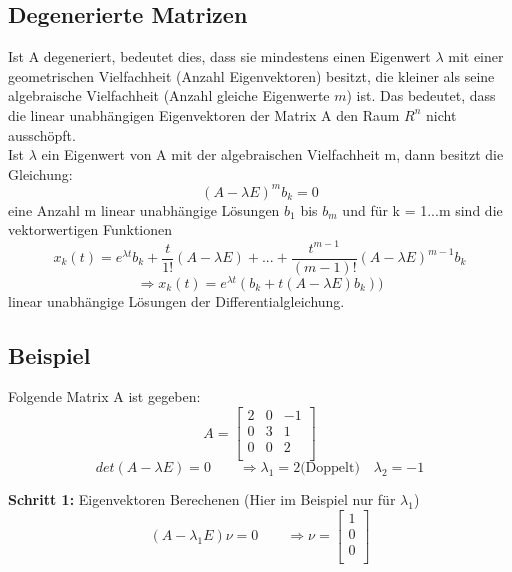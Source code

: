 \subsection{Degenerierte Matrizen}
Ist A degeneriert, bedeutet dies, dass sie mindestens einen Eigenwert $\lambda$ mit einer geometrischen Vielfachheit (Anzahl Eigenvektoren) besitzt, die kleiner als seine algebraische Vielfachheit (Anzahl gleiche Eigenwerte $m$) ist. 
Das bedeutet, dass die linear unabhängigen Eigenvektoren der Matrix A den Raum $R^n$ nicht ausschöpft.\\
Ist $\lambda$ ein Eigenwert von A mit der algebraischen Vielfachheit m, dann besitzt die Gleichung: 
\begin{equation*}
(A-\lambda E)^m b_k = 0
\end{equation*}
eine Anzahl m linear unabhängige Lösungen $b_1$ bis $b_m$ und für k = 1...m sind die vektorwertigen Funktionen
\begin{equation*}
x_k(t) = e^{\lambda t}{b_k + \frac{t}{1!}(A-\lambda E) + ... + \frac{t^{m-1}}{(m-1)!}(A-\lambda E)^{m-1}b_k}
\end{equation*}
\begin{equation*}
 \Longrightarrow x_k(t) = e^{\lambda t}(b_k + t (A-\lambda E) b_k))
\end{equation*}
linear unabhängige Lösungen der Differentialgleichung. 
\subsection{Beispiel}
Folgende Matrix A ist gegeben: 
\begin{equation*}
	A =     
\begin{bmatrix} %
	2 & 0 & -1\\
	0 & 3 & 1\\
	0 & 0 & 2\\
\end{bmatrix}
\end{equation*}
\begin{equation*}
det(A-\lambda E) = 0 \qquad \Longrightarrow \lambda_1 = 2 \text{(Doppelt)} \quad \lambda_2 = -1
\end{equation*}

\textbf{Schritt 1:} Eigenvektoren Berechenen (Hier im Beispiel nur für $\lambda_1$)\\
\begin{equation*}
(A - \lambda_1 E)\nu = 0 \qquad \Longrightarrow \nu = 
\begin{bmatrix} %
	1 \\
	0 \\
	0 \\
\end{bmatrix}
\end{equation*}


